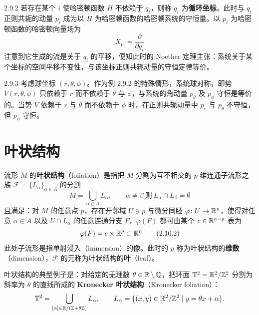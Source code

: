 \begin{example}{2.9.2}
若存在某个 $i$ 使哈密顿函数 $H$ 不依赖于 $q_i$，则称 $q_i$ 为\textbf{循环坐标}。此时与 $q_i$ 正则共轭的动量 $p_i$ 成为以 $H$ 为哈密顿函数的哈密顿系统的守恒量。以 $p_i$ 为哈密顿函数的哈密顿向量场为
\begin{equation}
  X_{p_i} = \frac{\partial}{\partial q_i}
  \tag{2.9.3}
\end{equation}
注意到它生成的流是关于 $q_i$ 的平移，便知此时的 Noether 定理主张：系统关于某个坐标的空间平移不变性，与该坐标正则共轭动量的守恒定律等价。
\end{example}

\begin{example}{2.9.3}
考虑球坐标 $(r,\theta,\phi)$。作为例 2.9.2 的特殊情形，系统球对称，即势 $V(r,\theta,\phi)$ 只依赖于 $r$ 而不依赖于 $\theta$ 与 $\phi$，与系统的角动量 $p_\theta$ 及 $p_\phi$ 守恒是等价的。当势 $V$ 依赖于 $r$ 与 $\theta$ 而不依赖于 $\phi$ 时，在正则共轭动量中 $p_r$ 与 $p_\theta$ 不守恒，但 $p_\phi$ 守恒。
\end{example}

\section{叶状结构}

流形 $M$ 的\textbf{叶状结构}（foliation）是指把 $M$ 分割为互不相交的 $p$ 维连通子流形之族 $\mathcal{F}=\{L_\alpha\}_{\alpha\in A}$ 的分割
\begin{equation}
  M = \bigcup_{\alpha\in A}L_\alpha,\qquad
  \alpha\neq\beta\ \text{则}\ L_\alpha\cap L_\beta=\emptyset
  \tag{2.10.1}
\end{equation}
且满足：对 $M$ 的任意点 $p$，存在开邻域 $U\ni p$ 与微分同胚 $\varphi\colon U\to\mathbb{R}^n$，使得对任意 $\alpha\in A$ 以及 $U\cap L_\alpha$ 的任意连通分支 $F$，$\varphi(F)$ 都可由某个 $c\in\mathbb{R}^{n-p}$ 表为
\begin{equation}
  \varphi(F) = c\times\mathbb{R}^p\subset\mathbb{R}^n
  \tag{2.10.2}
\end{equation}
此处子流形是指单射浸入（immersion）的像。此时的 $p$ 称为叶状结构的\textbf{维数}（dimension），$\mathcal{F}$ 的元称为叶状结构的\textbf{叶}（leaf）。

叶状结构的典型例子是：对给定的无理数 $\theta\in\mathbb{R}\setminus\mathbb{Q}$，把环面 $\mathbb{T}^2=\mathbb{R}^2/\mathbb{Z}^2$ 分割为斜率为 $\theta$ 的直线所成的 \textbf{Kronecker 叶状结构}（Kronecker foliation）：
\[
  \mathbb{T}^2 = \bigcup_{[\alpha]\in\mathbb{R}/(\mathbb{Z}+\theta\mathbb{Z})}L_\alpha,\qquad
  L_\alpha = \{(x,y)\in\mathbb{R}^2/\mathbb{Z}^2\mid y=\theta x+\alpha\}.
\]

